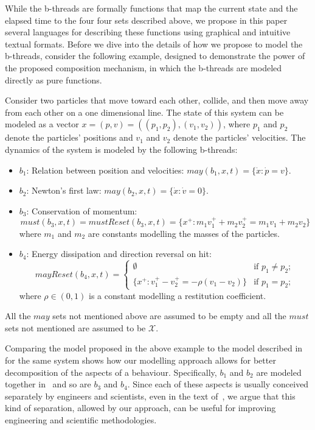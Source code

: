 \documentclass[11pt]{article}
\newcounter{example}
\begin{document}
While the b-threads are formally functions that map the current state and the elapsed time to the four four sets described above, we propose in this paper several languages for describing these functions using graphical and intuitive textual formats. Before we dive into the details of how we propose to model the b-threads, consider the following example, designed to demonstrate the power of the proposed composition mechanism, in which the b-threads are modeled directly as pure functions. 

\begin{example}
	\label{ex:collison}
Consider two particles that move toward each other, collide, and then move away from each other on a one dimensional line. The state of this system can be modeled as a vector $x = (p, v) = ((p_1, p_2),(v_1, v_2))$, where $p_1$ and $p_2$ denote the particles’ positions and $v_1$ and $v_2$ denote the particles’ velocities.  The dynamics of the system is modeled by the following b-threads:
	\begin{itemize}
		\item $b_1$: Relation between position and velocities: $may(b_1,x,t)=\{ \dot{x}\colon \dot{p}=v\}$.
		\item $b_2$: Newton's first law: $may(b_2,x,t)=\{ \dot{x} \colon \dot{v}=0\}$. 
		\item $b_3$: Conservation of momentum: 
		$$must(b_3,x,t)=mustReset(b_3,x,t)=\{ x^+\colon m_1 v_1^+ + m_2 v_2^+ =  m_1 v_1 + m_2 v_2 \}$$
		where $m_1$ and $m_2$ are constants modelling the masses of the particles. 
		\item $b_4$: Energy dissipation and direction reversal on hit: $$mayReset(b_4,x,t)=
		\begin{cases}
		\emptyset & \text{if }p_1 \neq p_2; \\
		\{ x^+\colon v_1^+ - v_2^+ =  - \rho (v_1 - v_2) \} & \text{if }p_1 =  p_2;
		\end{cases}
		$$ where $\rho \in (0,1)$ is a constant modelling a restitution coefficient. 
	\end{itemize}
	All the $may$ sets not mentioned above are assumed to be empty and all the $must$ sets not mentioned are assumed to be $\mathcal{X}$.
\end{example}

Comparing the model proposed in the above example to the model described in~\cite{goebel2009hybrid} for the same system shows how our modelling approach allows for better decomposition of the aspects of a behaviour. Specifically,  $b_1$ and $b_2$ are modeled together in~\cite{goebel2009hybrid} and so are $b_3$ and $b_4$. Since each of these aspects is usually conceived separately by engineers and scientists, even in the text of~\cite{goebel2009hybrid}, we argue that this kind of separation, allowed by our approach, can be useful for improving engineering and scientific methodologies. 
\end{document}
